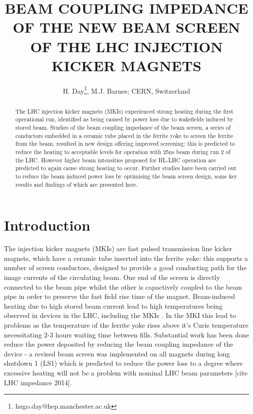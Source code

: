 \documentclass[a4paper,
              ]{jacow}
\begin{document}
\title{BEAM COUPLING IMPEDANCE OF THE NEW BEAM SCREEN OF THE LHC INJECTION KICKER MAGNETS}
\author{H. Day\thanks{hugo.day@hep.manchester.ac.uk}, M.J. Barnes;  CERN, Switzerland}

\maketitle 


\begin{abstract}
The LHC injection kicker magnets (MKIs) experienced strong heating during the first operational run, identified as being caused by power loss due to wakefields induced by stored beam. Studies of the beam coupling impedance of the beam screen, a series of conductors embedded in a ceramic tube placed in the ferrite yoke to screen the ferrite from the beam, resulted in new design offering improved screening: this is predicted to reduce the heating to acceptable levels for operation with 25ns beam during run 2 of the LHC. However higher beam intensities proposed for HL-LHC operation are predicted to again cause strong heating to occur. Further studies have been carried out to reduce the beam induced power loss by optimising the beam screen design, some key results and findings of which are presented here.
\end{abstract}

\section{Introduction}

The injection kicker magnets (MKIs) are fast pulsed transmission line kicker magnets, which have a ceramic tube inserted into the ferrite yoke: this supports a number of screen conductors, designed to provide a good conducting path for the image currents of the circulating beam. One end of the screen is directly connected to the beam pipe whilst the other is capactively coupled to the beam pipe in order to preserve the fast field rise time of the magnet. Beam-induced heating due to high stored beam current lead to high temperatures being observed in devices in the LHC, including the MKIs \cite{mki-heating}. In the MKI this lead to problems as the temperature of the ferrite yoke rises above it's Curie temperature necessitating 2-3 hours waiting time between fills. Substantial work has been done reduce the power deposited by reducing the beam coupling impedance of the device - a revised beam screen was implemented on all magnets during long shutdown 1 (LS1) which is predicted to reduce the power loss to a degree where excessive heating will not be a problem with nominal LHC beam parameters [cite LHC impedance 2014]. 
\end{document}
